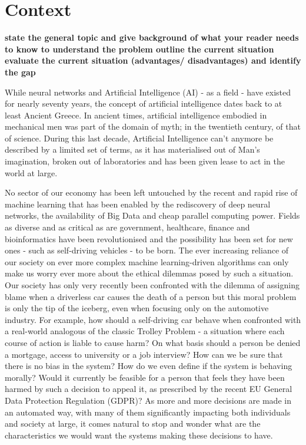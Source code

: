 
\section{Context}
\textbf{state the general topic and give background of what your reader needs to know to understand the problem outline the current situation evaluate the current situation (advantages/ disadvantages) and identify the gap}


While neural networks and Artificial Intelligence (AI) - as a field - have existed for nearly seventy years, the concept of artificial intelligence dates back to at least Ancient Greece.  In ancient times, artificial intelligence embodied in mechanical men was part of the domain of myth; in the twentieth century, of that of science.  During this last decade, Artificial Intelligence can't anymore  be described by a limited set of terms, as it has materialised out of Man's imagination, broken out of laboratories and has been given lease to act in the world at large.


No sector of our economy has been left untouched by the recent and rapid rise of machine learning that has been enabled by the rediscovery of deep neural networks, the availability of Big Data and cheap parallel computing power.  Fields as diverse and as critical as are government, healthcare, finance and bioinformatics have been revolutionised and the possibility has been set for new ones - such as self-driving vehicles - to be born.  
The ever increasing reliance of our society on ever more complex machine learning-driven algorithms can only make us worry ever more about the ethical dilemmas posed by such a situation.  
Our society has only very recently been confronted with the dilemma of assigning blame when a driverless car causes the death of a person but this moral problem is only the tip of the iceberg, even when focusing only on the automotive industry.  For example, how should a self-driving car behave when confronted with a real-world analogous of the classic Trolley Problem - a situation where each course of action is liable to cause harm?  
On what basis should a person be denied a mortgage, access to university or a job interview?  How can we be sure that there is no bias in the system?  How do we even define if the system is behaving morally?  Would it currently be feasible for a person that feels they have been harmed by such a decision to appeal it, as prescribed by the recent EU General Data Protection Regulation (GDPR)? 
As more and more decisions are made in an automated way, with many of them significantly impacting both individuals and society at large, it comes natural to stop and wonder what are the characteristics we would want the systems making these decisions to have.   

